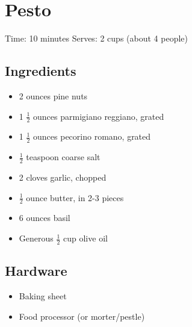 \section{Pesto}
\label{pesto}
\setcounter{secnumdepth}{0}
Time: 10 minutes
Serves: 2 cups (about 4 people)

\begin{multicols}{2}
\subsection*{Ingredients}
\begin{itemize}
    \item 2 ounces pine nuts
    \item 1 \( \frac{1}{2} \) ounces parmigiano reggiano, grated
    \item 1 \( \frac{1}{2} \) ounces pecorino romano, grated
    \item \( \frac{1}{2} \) teaspoon coarse salt
    \item 2 cloves garlic, chopped
    \item \( \frac{1}{2} \) ounce butter, in 2-3 pieces
    \item 6 ounces basil
    \item Generous \( \frac{1}{2} \) cup olive oil
\end{itemize}

\subsection*{Hardware}
\begin{itemize}
    \item Baking sheet
    \item Food processor (or morter/pestle)
\end{itemize}
\clearpage


\end{multicols}
